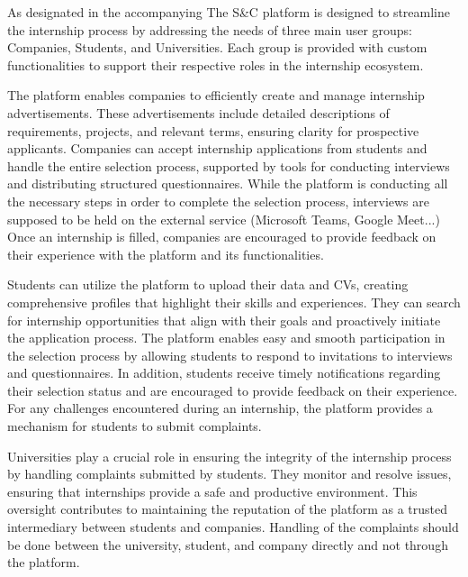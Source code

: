 As designated in the accompanying The S\&C platform is designed to streamline the internship process by addressing the needs of three main user groups: Companies, Students, and Universities. Each group is provided with custom functionalities to support their respective roles in the internship ecosystem.

The platform enables companies to efficiently create and manage internship advertisements. These advertisements include detailed descriptions of requirements, projects, and relevant terms, ensuring clarity for prospective applicants. Companies can accept internship applications from students and handle the entire selection process, supported by tools for conducting interviews and distributing structured questionnaires. While the platform is conducting all the necessary steps in order to complete the selection process, interviews are supposed to be held on the external service (Microsoft Teams, Google Meet...) Once an internship is filled, companies are encouraged to provide feedback on their experience with the platform and its functionalities.

Students can utilize the platform to upload their data and CVs, creating comprehensive profiles that highlight their skills and experiences. They can search for internship opportunities that align with their goals and proactively initiate the application process. The platform enables easy and smooth participation in the selection process by allowing students to respond to invitations to interviews and questionnaires. In addition, students receive timely notifications regarding their selection status and are encouraged to provide feedback on their experience. For any challenges encountered during an internship, the platform provides a mechanism for students to submit complaints. 

Universities play a crucial role in ensuring the integrity of the internship process by handling complaints submitted by students. They monitor and resolve issues, ensuring that internships provide a safe and productive environment. This oversight contributes to maintaining the reputation of the platform as a trusted intermediary between students and companies. Handling of the complaints should be done between the university, student, and company directly and not through the platform.